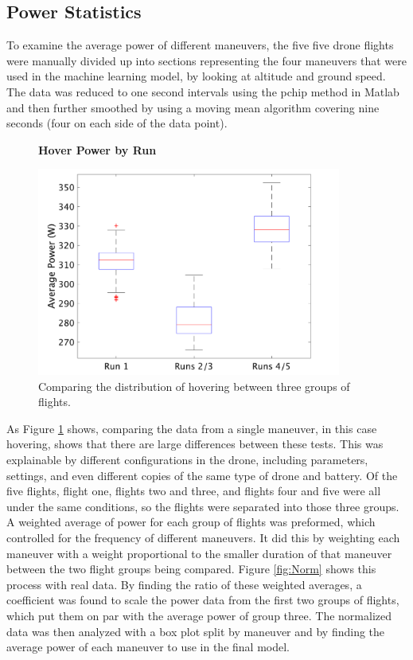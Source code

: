 \documentclass{article}
\begin{document}
\subsection{Power Statistics}
To examine the average power of different maneuvers, the five five drone flights were manually divided up into sections representing the four maneuvers that were used in the machine learning model, by looking at altitude and ground speed. The data was reduced to one second intervals using the pchip method in Matlab and then further smoothed by using a moving mean algorithm covering nine seconds (four on each side of the data point).\par

\begin{figure}[!h]
  \centering
  \large{\textbf{Hover Power by Run}}\par
  \includegraphics[width = 100mm]{images/HoverPlain.png}
  \caption{Comparing the distribution of hovering between three groups of flights.}
  \label{fig:hover}
\end{figure}

As Figure \ref{fig:hover} shows, comparing the data from a single maneuver, in this case hovering, shows that there are large differences between these tests. This was explainable by different configurations in the drone, including parameters, settings, and even different copies of the same type of drone and battery. Of the five flights, flight one, flights two and three, and flights four and five were all under the same conditions, so the flights were separated into those three groups. A weighted average of power for each group of flights was preformed, which controlled for the frequency of different maneuvers. It did this by weighting each maneuver with a weight proportional to the smaller duration of that maneuver between the two flight groups being compared. Figure \ref{fig:Norm} shows this process with real data. By finding the ratio of these weighted averages, a coefficient was found to scale the power data from the first two groups of flights, which put them on par with the average power of group three. The normalized data was then analyzed with a box plot split by maneuver and by finding the average power of each maneuver to use in the final model.\par
\end{document}
